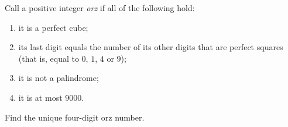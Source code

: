 Call a positive integer \emph{orz} if all of the following hold:
\begin{enumerate}
\item it is a perfect cube;
\item its last digit equals the number of its other digits that are perfect squares (that is, equal to $0$, $1$, $4$ or $9$);
\item it is not a palindrome;
\item it is at most $9000$.
\end{enumerate}
Find the unique four-digit orz number.

